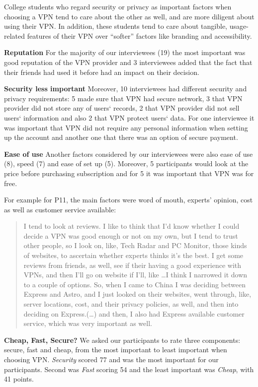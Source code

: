 College students who regard security or privacy as important factors when
choosing a VPN tend to care about the other as well, and are more diligent
about using their VPN. In addition, these students tend to care about
tangible, usage-related features of their VPN over “softer” factors like
branding and accessibility.


\textbf{Reputation} For the majority of our interviewees (19) the most
important was good reputation of the VPN provider and 3 interviewees added
that the fact that their friends had used it before had an impact on their
decision. 

\textbf{Security less important} Moreover, 10 interviewees had different
security and privacy requirements: 5 made sure that VPN had secure network, 3
that VPN provider did not store any of users‘ records, 2 that VPN provider did
not sell users‘ information and also 2 that VPN protect users‘ data. For one
interviewee it was important that VPN did not require any personal information
when setting up the account and another one that there was an option of secure
payment. 

\textbf{Ease of use} Another factors considered by our interviewees were also
ease of use (8), speed (7) and ease of set up (5). Moreover, 5 participants
would look at the price before purchasing subscription and for 5 it was
important that VPN was for free.   

For example for P11, the main factors were word of mouth, experts’ opinion,
cost as well as customer service available: \begin{quote}I tend to look at
    reviews. I like to think that I'd know whether I could decide a VPN was
    good enough or not on my own, but I tend to trust other people, so I look
    on, like, Tech Radar and PC Monitor, those kinds of websites, to ascertain
    whether experts thinks it's the best. I get some reviews from friends, as
    well, see if their having a good experience with VPNs, and then I'll go on
    website if I'll, like \dots I think I narrowed it down to a couple of
    options. So, when I came to China I was deciding between Express and
    Astro, and I just looked on their websites, went through, like, server
    locations, cost, and their privacy policies, as well, and then into
    deciding on Express.(\dots) and then, I also had Express available
customer service, which was very important as well.\end{quote}

\textbf{Cheap, Fast, Secure?} We asked our participants to rate three
components: secure, fast and cheap, from the most important to least important
when choosing VPN. \textit{Security} scored 77 and was the most important for
our participants. Second was \textit{Fast} scoring 54 and the least important
was \textit{Cheap}, with 41 points.


